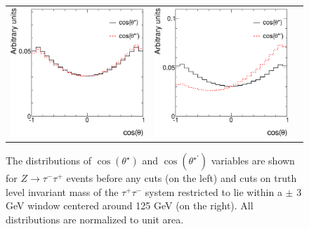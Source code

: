 \documentclass[12pt]{article}
\begin{document}
\begin{figure}[htp!]
\begin{tabular}{ccc}
\includegraphics[width=0.48\columnwidth]{Ztautau_8TeV_cstar_cstarp_nocuts.eps} & 
\includegraphics[width=0.48\columnwidth]{Ztautau_8TeV_cstar_cstarp_cutt.eps} 
\end{tabular}
\caption{The distributions of $\cos(\theta^\star)$ and $\cos(\theta^{\star\prime})$ variables are shown for $Z\to\tau^-\tau^+$ events before any cuts (on the left)
and cuts on truth level invariant mass of the $\tau^+\tau^-$ system restricted to lie within a $\pm$ 3 GeV window centered around 125 GeV (on the right).
All distributions are normalized to unit area.
}
\label{CstarCstarprime_Z}
\end{figure}
\end{document}
